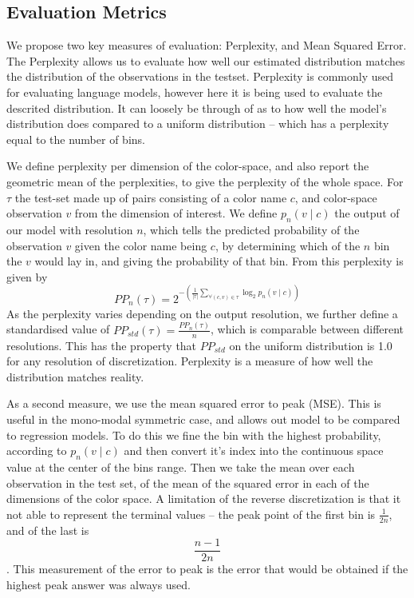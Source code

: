 \documentclass[11pt,letterpaper]{article}
\begin{document}
\subsection{Evaluation Metrics}
We propose two key measures of evaluation: Perplexity, and Mean Squared Error.
The Perplexity allows us to evaluate how well our estimated distribution matches the distribution of the observations in the testset.
Perplexity is commonly used for evaluating language models, however here it is being used to evaluate the descrited distribution.
It can loosely be through of as to how well the model's distribution does compared to a uniform distribution -- which has a perplexity equal to the number of bins.


We define perplexity per dimension of the color-space, and also report the geometric mean of the perplexities, to give the perplexity of the whole space.
For $\tau$ the test-set made up of pairs consisting of a color name $c$, and color-space observation $v$ from the dimension of interest.
We define $p_n(v\mid c)$ the output of our model with resolution $n$, which tells the predicted probability of the observation $v$ given the color name being $c$,
by determining which of the $n$ bin the $v$ would lay in, and giving the probability of that bin.
From this perplexity is given by
\[
 PP_n(\tau) = 2^{-\left(\displaystyle\frac{1}{|\tau|} \displaystyle\sum_{\forall(c,v) \in \tau} \log_2 p_n(v\mid c)\right)}
\]
As the perplexity varies depending on the output resolution,
we further define a standardised value of $PP_{std}(\tau) = \frac{PP_n(\tau)}{n}$, which is comparable between different resolutions.
This has the property that $PP_{std}$ on the uniform distribution is 1.0 for any resolution of discretization.
Perplexity is a measure of how well the distribution matches reality.


As a second measure, we use the mean squared error to peak (MSE).
This is useful in the mono-modal symmetric case, and allows out model to be compared to regression models.
To do this we fine the bin with the highest probability, according to $p_n(v\mid c)$ and then convert it's index into the continuous space value at the center of the bins range.
Then we take the mean over each observation in the test set, of the mean of the squared error in each of the dimensions of the color space.
A limitation of the reverse discretization is that it not able to represent the terminal values -- the peak point of the first bin is $\frac{1}{2n}$, and of the last is $$\frac{n-1}{2n}$$.
This measurement of the error to peak is the error that would be obtained if the highest peak answer was always used.
\end{document}
